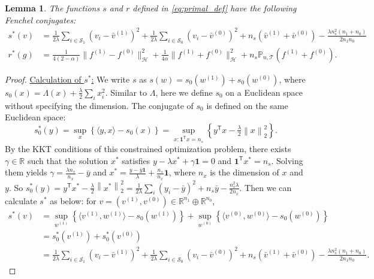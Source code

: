 \documentclass[12pt]{article}
\newtheorem{lemma}{Lemma}
\newcommand{\prob}{\mathbb{P}}
\begin{document}
\begin{lemma}
	\label{lem:dual_of_s_r}
	The functions $s$ and $r$ defined in \eqref{eq:primal_def} have the following Fenchel conjugates:
	\begin{align}
		s^*(v) &= \frac{1}{2\lambda} \sum_{i \in \mathcal{S}_1} (v_i - \bar{v}^{(1)})^2
		+ \frac{1}{2\lambda} \sum_{i \in \mathcal{S}_0} (v_i - \bar{v}^{(0)})^2
		+ n_s (\bar{v}^{(1)} + \bar{v}^{(0)}) - \frac{\lambda n_s^2 (n_1 + n_0)}{2 n_1 n_0}
		\label{eq:s_star}\\
		r^*(g) &= 
		\frac{1}{4(2-\alpha)} \| f^{(1)} - f^{(0)} \|_\mathcal{H}^2 +
		\frac{1}{4\alpha} \| f^{(1)} + f^{(0)} \|_\mathcal{H}^2 +
		n_s \prob_{n, \mathcal{T}}(f^{(1)} + f^{(0)})
		\label{eq:r_star}
		.\end{align}
\end{lemma}
\begin{proof}
	\underline{Calculation of $s^*$:}
	We write $s$ as $s(w) = s_0(w^{(1)}) + s_0(w^{(0)})$, where $s_0(x) = \Lambda(x) + \frac{\lambda}{2} \sum_i x_i^2$. Similar to $\Lambda$, here we define $s_0$ on a Euclidean space without specifying the dimension. The conjugate of $s_0$ is defined on the same Euclidean space:
	\begin{equation*}
		s_0^*(y) =
		\sup_{x} \left\{ \langle y, x \rangle - s_0(x) \right\} =
		\sup_{x: \mathbf{1}^\mathsf{T} x = n_s} \left\{ y^\mathsf{T}x - \tfrac{\lambda}{2} \left\| x \right\|_2^2 \right\} 
		.\end{equation*}
	By the KKT conditions of this constrained optimization problem, there exists $\gamma \in \mathbb{R}$ such that the solution $x^*$ satisfies $y - \lambda x^* + \gamma \mathbf{1} = 0$ and $\mathbf{1}^\mathsf{T}x^* = n_s$. Solving them yields $\gamma = \frac{\lambda n_s}{n_x} - \bar{y}$ and $x^* = \frac{y - \bar{y}\mathbf{1}}{\lambda} + \frac{n_s}{n_x}\mathbf{1}$, where $n_x$ is the dimension of $x$ and $y$. So $s_0^*(y) = y^\mathsf{T} x^* - \frac{\lambda}{2} \left\| x^* \right\|_2^2 = \frac{1}{2\lambda} \sum_i (y_i - \bar{y})^2 + n_s \bar{y} - \frac{n_s^2\lambda}{2n_x}$.
	Then we can calculate $s^*$ as below: for $v = (v^{(1)}, v^{(0)}) \in \mathbb{R}^{n_1} \oplus \mathbb{R}^{n_0}$,
	\begin{align*}
		s^*(v)
		&= \sup_{w^{(1)}} \left\{ \langle v^{(1)}, w^{(1)} \rangle - s_0(w^{(1)}) \right\} 
		+ \sup_{w^{(0)}} \left\{ \langle v^{(0)}, w^{(0)} \rangle - s_0(w^{(0)}) \right\} \\
		&= s_0^*(v^{(1)}) + s_0^*(v^{(0)}) \\
		&= \frac{1}{2\lambda} \sum_{i \in \mathcal{S}_1} (v_i - \bar{v}^{(1)})^2
		+ \frac{1}{2\lambda} \sum_{i \in \mathcal{S}_0} (v_i - \bar{v}^{(0)})^2
		+ n_s (\bar{v}^{(1)} + \bar{v}^{(0)}) - \frac{\lambda n_s^2 (n_1 + n_0)}{2 n_1 n_0}
		.\end{align*}
	

\end{proof}
\end{document}
